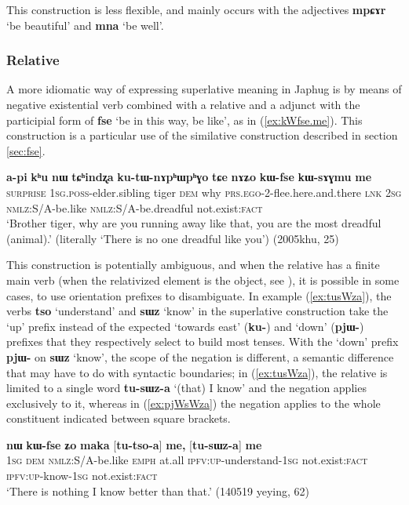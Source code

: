 \documentclass[oneside,a4paper,11pt]{article}
\newcommand{\ipa}[1]{{\phon\textbf{#1}}} %
\newcommand{\forme}[2]{\ipa{#1} `#2'}
\begin{document}
This construction is less flexible, and mainly occurs with the adjectives \forme{mpɕɤr}{be beautiful} and \forme{mna}{be well}.

 \subsubsection{Relative} \label{sec:relative.superlative}
 A more idiomatic way of expressing superlative meaning in Japhug is by means of negative existential verb combined with a relative and a adjunct with the participial form of \forme{fse}{be in this way, be like}, as in (\ref{ex:kWfse.me}). This construction is a particular use of the similative construction described in section \ref{sec:fse}.
 
 \begin{exe}
\ex \label{ex:kWfse.me}
\gll \ipa{ama} 	\ipa{a-pi} 	\ipa{kʰu} 	\ipa{nɯ} 	\ipa{tɕʰindʐa} 	\ipa{ku-tɯ-nɤpʰɯpʰɣo} 	\ipa{tɕe}  \ipa{nɤʑo} 	\ipa{kɯ-fse} 	\ipa{kɯ-sɤɣmu} 	\ipa{me} 	\\
\textsc{surprise} \textsc{1sg.poss}-elder.sibling tiger \textsc{dem} why \textsc{prs.ego}-2-flee.here.and.there \textsc{lnk} \textsc{2sg}  \textsc{nmlz}:S/A-be.like   \textsc{nmlz}:S/A-be.dreadful  not.exist:\textsc{fact} \\
\glt `Brother tiger, why are you running away like that, you are the most dreadful (animal).' (literally `There is no one dreadful like you') (2005khu, 25)
\end{exe}

This construction is potentially ambiguous, and when the relative has a finite main verb (when the relativized element is the object, see \citealt{jacques16relatives}), it is possible in some cases, to use orientation prefixes to disambiguate. In example (\ref{ex:tusWza}), the verbs \forme{tso}{understand} and \forme{sɯz}{know} in the superlative construction take the `up' prefix instead of the expected `towards east' (\ipa{ku-}) and `down' (\ipa{pjɯ-}) prefixes that they respectively select to build most tenses. With the  `down' prefix \ipa{pjɯ-} on \forme{sɯz}{know}, the scope of the negation is different, a semantic difference that may have to do with syntactic boundaries; in (\ref{ex:tusWza}), the relative is limited to a single word \ipa{tu-sɯz-a} `(that) I know' and the negation applies exclusively to it, whereas in (\ref{ex:pjWsWza}) the negation applies to the whole constituent indicated between square brackets.
 

\begin{exe}
\ex \label{ex:tusWza}
\gll \ipa{aʑo} 	\ipa{nɯ} 	\ipa{kɯ-fse} 	\ipa{ʑo} 	\ipa{maka} [\ipa{tu-tso-a}] 	\ipa{me,} [\ipa{tu-sɯz-a}] 	\ipa{me} \\
\textsc{1sg} \textsc{dem} \textsc{nmlz}:S/A-be.like \textsc{emph} at.all \textsc{ipfv:up}-understand-\textsc{1sg} not.exist:\textsc{fact} \textsc{ipfv:up}-know-\textsc{1sg} not.exist:\textsc{fact} \\
\glt `There is nothing I know better than that.' (140519 yeying, 62)
\end{exe}
\end{document}
